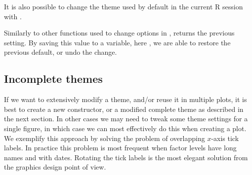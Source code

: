 \documentclass[krantz2]{krantz}\usepackage{knitr}%
\begin{document}
\begin{knitrout}\footnotesize
{}\color{fgcolor}\begin{kframe}
\begin{alltt}
 \hlkwb{<-}   \hlopt{+}
       \hlstd{()}
 \hlopt{+} \hlstd{())}
\end{alltt}
\end{kframe}
\end{knitrout}

It is also possible to change the theme used by default in the current R session with .

\begin{knitrout}\footnotesize
{}\color{fgcolor}\begin{kframe}
\begin{alltt}
 \hlkwb{<-} \hlstd{(}\hlstd{(}\hlstd{))}
\end{alltt}
\end{kframe}
\end{knitrout}

Similarly to other functions used to change options in \Rlang,  returns the previous setting. By saving this value to a variable, here , we are able to restore the previous default, or undo the change.

\begin{knitrout}\footnotesize
{}\color{fgcolor}\begin{kframe}
\begin{alltt}
\end{alltt}
\end{kframe}
\end{knitrout}

\subsection{Incomplete themes}
If we want to extensively modify a theme, and/or reuse it in multiple plots, it is best to create a new constructor, or a modified complete theme as described in the next section. In other cases we may need to tweak some theme settings for a single figure, in which case we can most effectively do this when creating a plot. We exemplify this approach by solving the problem of overlapping $x$-axis tick labels. In practice this problem is most frequent when factor levels have long names and with dates. Rotating the tick labels is the most elegant solution from the graphics design point of view.
\end{document}
